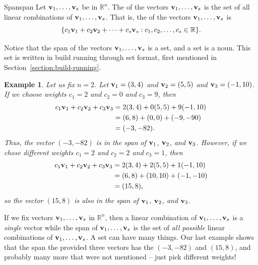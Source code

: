 \documentclass{book}
\newcounter{ekcounter}%
\theoremstyle{ekimcustom}
\newtheorem{example}[ekcounter]{Example}
\newcommand\defn[1]{{\color{blue}{\bf #1}}}
\begin{document}
\begin{bdefinition}{Span}{span}
Let ${\bf v}_1, \dots, {\bf v}_s$ be in $\mathbb{R}^n$. The \defn{span} of the vectors ${\bf v}_1, \dots, {\bf v}_s$ is the set of all linear combinations of ${\bf v}_1, \dots, {\bf v}_s$. That is, the \defn{span} of the vectors ${\bf v}_1, \dots, {\bf v}_s$ is
\[ \{c_1{\bf v}_1 + c_2{\bf v}_2 + \dots + c_s{\bf v}_s: c_1,c_2,\dots,c_s \in \mathbb{R}\}.\]
\end{bdefinition}
Notice that the span of the vectors ${\bf v}_1, \dots, {\bf v}_s$ is a set, and a set is a noun. This set is written in build running through set format, first mentioned in Section~\ref{section:build-running}.
\begin{example}
Let us fix $n=2$. Let ${\bf v}_1 = (3,4)$ and ${\bf v}_2=(5,5)$ and ${\bf v}_3=(-1,10)$. If we choose weights $c_1=2$ and $c_2=0$ and $c_3=9$, then
\begin{align*}
c_1{\bf v}_1 + c_2{\bf v}_2 +  c_3{\bf v}_3
&= 2(3,4) + 0(5,5) + 9(-1,10)\\
&= (6,8)+(0,0)+(-9,-90)\\
&= (-3,-82).
\end{align*}
Thus, the vector $(-3,-82)$ is in the span of ${\bf v}_1$, ${\bf v}_2$, and ${\bf v}_3$. However, if we chose different weights $c_1=2$ and $c_2=2$ and $c_3=1$, then
\begin{align*}
c_1{\bf v}_1 + c_2{\bf v}_2 +  c_3{\bf v}_3
&= 2(3,4) + 2(5,5) + 1(-1,10)\\
&= (6,8)+(10,10)+(-1,-10)\\
&=(15,8),
\end{align*}
so the vector $(15,8)$ is also in the span of ${\bf v}_1$, ${\bf v}_2$, and ${\bf v}_3$.
\end{example}

If we fix vectors ${\bf v}_1, \dots, {\bf v}_s$ in $\mathbb{R}^n$, then a linear combination of ${\bf v}_1, \dots, {\bf v}_s$ is a \emph{single} vector while the span of ${\bf v}_1, \dots, {\bf v}_s$ is the set of \emph{all possible} linear combinations of ${\bf v}_1, \dots, {\bf v}_s$. A set can have many things. Our last example shows that the span the provided three vectors has the $(-3,-82)$ and $(15,8)$, and probably many more that were not mentioned -- just pick different weights!
\end{document}

